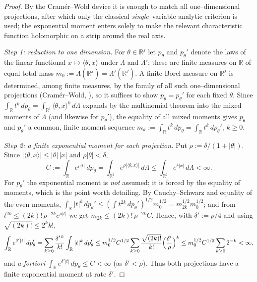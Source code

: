\documentclass[11pt]{article}
\theoremstyle{definition}
\theoremstyle{remark}
\newcommand{\R}{\mathbb{R}}
\numberwithin{equation}{section}
\theoremstyle{plain}
\theoremstyle{definition}
\theoremstyle{remark}
\theoremstyle{plain}
\begin{document}
\begin{proof}
By the Cram\'er--Wold device it is enough to match all one--dimensional
projections, after which only the classical \emph{single}--variable analytic
criterion is used; the exponential moment enters solely to make the relevant
characteristic function holomorphic on a strip around the real axis.

\emph{Step 1: reduction to one dimension.} For $\theta\in\R^j$ let
$p_\theta$ and $p_\theta'$ denote the laws of the linear functional
$x\mapsto\langle\theta,x\rangle$ under $\Lambda$ and $\Lambda'$; these are
finite measures on $\R$ of equal total mass $m_0:=\Lambda(\R^j)=\Lambda'(\R^j)$.
A finite Borel measure on $\R^j$ is determined, among finite measures, by the
family of all such one--dimensional projections (Cram\'er--Wold,
\cite[Thm.~29.4]{Bil95}), so it suffices to show $p_\theta=p_\theta'$ for each
fixed $\theta$. Since $\int_\R t^k\,dp_\theta=\int_{\R^j}\langle\theta,x\rangle^k
\,d\Lambda$ expands by the multinomial theorem into the mixed moments of
$\Lambda$ (and likewise for $p_\theta'$), the equality of all mixed moments
gives $p_\theta$ and $p_\theta'$ a common, finite moment sequence
$m_k:=\int_\R t^k\,dp_\theta=\int_\R t^k\,dp_\theta'$, $k\ge0$.

\emph{Step 2: a finite exponential moment for each projection.} Put
$\rho:=\delta/(1+|\theta|)$. Since $|\langle\theta,x\rangle|\le|\theta|\,|x|$ and
$\rho|\theta|<\delta$,
\[
C:=\int_\R e^{\rho|t|}\,dp_\theta=\int_{\R^j}e^{\rho|\langle\theta,x\rangle|}
\,d\Lambda\le\int_{\R^j}e^{\delta|x|}\,d\Lambda<\infty .
\]
For $p_\theta'$ the exponential moment is \emph{not} assumed; it is forced
by the equality of moments, which is the point worth detailing. By
Cauchy--Schwarz and equality of the even moments,
$\int_\R|t|^k\,dp_\theta'\le(\int t^{2k}\,dp_\theta')^{1/2}m_0^{1/2}
=m_{2k}^{1/2}m_0^{1/2}$; and from $t^{2k}\le(2k)!\,\rho^{-2k}e^{\rho|t|}$ we get
$m_{2k}\le(2k)!\,\rho^{-2k}C$. Hence, with $\delta':=\rho/4$ and using
$\sqrt{(2k)!}\le 2^k k!$,
\[
\int_\R e^{\delta'|t|}\,dp_\theta'
=\sum_{k\ge0}\frac{\delta'^{\,k}}{k!}\int_\R|t|^k\,dp_\theta'
\le m_0^{1/2}C^{1/2}\sum_{k\ge0}\frac{\sqrt{(2k)!}}{k!}\Bigl(\frac{\delta'}{\rho}
\Bigr)^{k}
\le m_0^{1/2}C^{1/2}\sum_{k\ge0}2^{-k}<\infty ,
\]
and \emph{a fortiori} $\int_\R e^{\delta'|t|}\,dp_\theta\le C<\infty$ (as
$\delta'<\rho$). Thus both projections have a finite exponential moment at rate
$\delta'$.


\end{proof}
\end{document}
